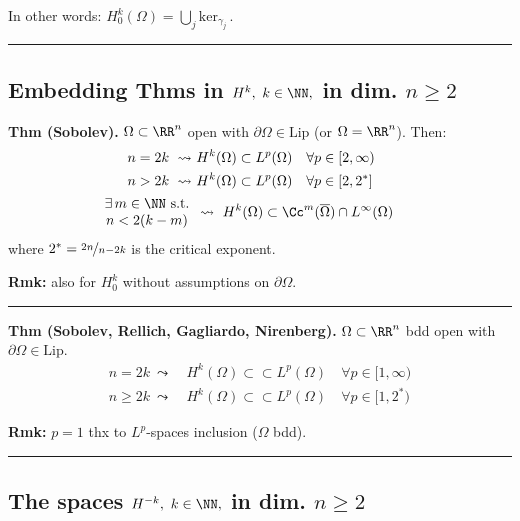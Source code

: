 In other words: $H^k_0(\Omega)=\bigcup_j\text{ker}_{\gamma_j}\,.$

\rule{0.31\textwidth}{0.2pt}


\subsection{\color{red}Embedding Thms in \texorpdfstring{$H^k,\ k\in\NN,$}{C} in dim. \texorpdfstring{$n\geq 2$}{C}}


\textbf{Thm (Sobolev).} $\Omega\subset \RR^n$ open with $\partial\Omega\in\text{Lip}$ (or $\Omega=\RR^n$). Then:
\begin{align*}
n=2k\ \leadsto\ &H^k(\Omega)\subset L^p(\Omega)\quad \forall p\in [2,\infty) \\
n>2k\ \leadsto\ &H^k(\Omega)\subset L^p(\Omega)\quad \forall p\in [2,2^*] \\
\begin{array}{c}
\exists\, m\in\NN\text{ s.t.}\\
n<2(k-m)   
\end{array}& 
\leadsto\ H^k(\Omega)\subset \Cc^m(\overline{\Omega})\cap L^\infty(\Omega)\qquad
\end{align*}
where $2^*=\nicefrac{2n}{n-2k}$ is the critical exponent.

\smallskip

\textbf{Rmk:} also for $H^k_0$ without assumptions on $\partial\Omega$.

\rule{0.31\textwidth}{0.2pt}
\smallskip

\textbf{Thm (Sobolev, Rellich, Gagliardo, Nirenberg).} $\Omega\subset \RR^n$ bdd open with $\partial\Omega\in\text{Lip}$.
\begin{align*}
n=2k\ \leadsto\ &H^k(\Omega)\subset\subset L^p(\Omega)\quad \forall p\in [1,\infty) \\
n\geq 2k\ \leadsto\ &H^k(\Omega)\subset\subset L^p(\Omega)\quad \forall p\in [1,2^*)
\end{align*}

\smallskip

\textbf{Rmk:} $p=1$ thx to $L^p$-spaces inclusion ($\Omega$ bdd).

\rule{0.31\textwidth}{0.2pt}


\subsection{\color{red}The spaces \texorpdfstring{$H^{-k},\ k\in\NN,$}{C} in dim. \texorpdfstring{$n\geq 2$}{C}}


